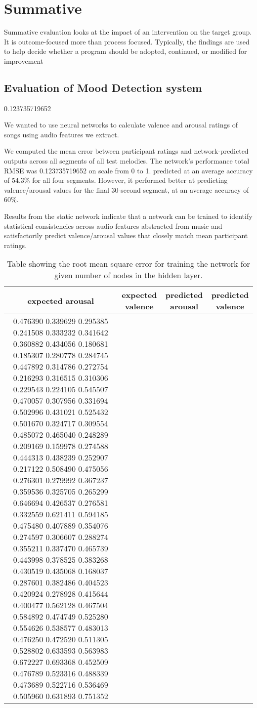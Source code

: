 \section{Summative}
Summative evaluation looks at the impact of an intervention on the target group. It is outcome-focused more than process focused. Typically, the findings are used to help decide whether a program should be adopted, continued, or modified for improvement


\subsection{Evaluation of Mood Detection system}

0.123735719652

We wanted to use neural networks to calculate valence and arousal ratings of songs using audio features we extract. 

We computed the mean error between participant ratings and network-predicted outputs across all segments of all test melodies. The network's performance total RMSE was 0.123735719652 on scale from 0 to 1. 
 predicted at an average accuracy of 54.3\% for all four segments. However, it performed better at predicting valence/arousal values for the final 30-second segment, at an average accuracy of 60\%. 

Results from the static network indicate that a network can be trained to identify statistical consistencies across audio features abstracted from music and satisfactorily predict valence/arousal values that closely match mean participant ratings.


\begin{table}
\begin{center}
\begin{tabular}{| c | c | c | c| } \hline 
 expected arousal & expected valence & predicted arousal & predicted valence \\ \hline \hline
  0.476390 0.339629
0.295385 0.241508
0.333232 0.341642
0.360882 0.434056
0.180681 0.185307
0.280778 0.284745
0.447892 0.314786
0.272754 0.216293
0.316515 0.310306
0.229543 0.224105
0.545507 0.470057
0.307956 0.331694
0.502996 0.431021
0.525432 0.501670
0.324717 0.309554
0.485072 0.465040
0.248289 0.209169
0.159978 0.274588
0.444313 0.438239
0.252907 0.217122
0.508490 0.475056
0.276301 0.279992
0.367237 0.359536
0.325705 0.265299
0.646694 0.426537
0.276581 0.332559
0.621411 0.594185
0.475480 0.407889
0.354076 0.274597
0.306607 0.288274
0.355211 0.337470
0.465739 0.443998
0.378525 0.383268
0.430519 0.435068
0.168037 0.287601
0.382486 0.404523
0.420924 0.278928
0.415644 0.400477
0.562128 0.467504
0.584892 0.474749
0.525280 0.554626
0.538577 0.483013
0.476250 0.472520
0.511305 0.528802
0.633593 0.563983
0.672227 0.693368
0.452509 0.476789
0.523316 0.488339
0.473689 0.522716
0.536469 0.505960
0.631893 0.751352

\end{tabular}
\caption{Table showing the root mean square error for training the network for given number of nodes in the hidden layer.}
\label{table:rsmetable}
\end{center}
\end{table}



